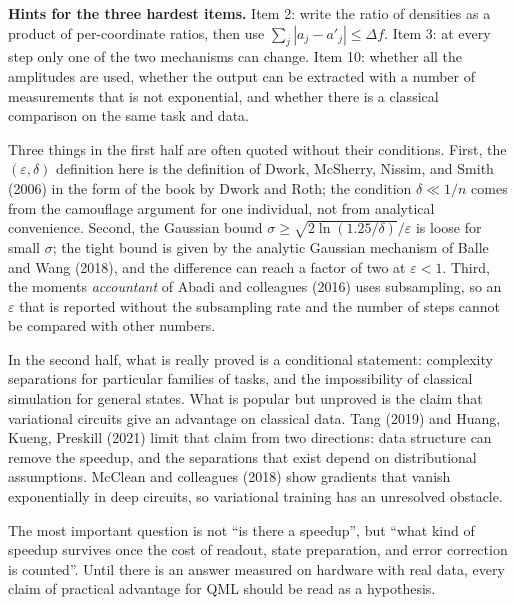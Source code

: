 \begin{latihan}
\noindent\textbf{Hints for the three hardest items.} Item 2: write the ratio of densities
as a product of per-coordinate ratios, then use $\sum_j|a_j-a'_j|\le\Delta f$. Item 3: at
every step only one of the two mechanisms can change. Item 10: whether all the amplitudes
are used, whether the output can be extracted with a number of measurements that is not
exponential, and whether there is a classical comparison on the same task and data.
\end{latihan}

\begin{untukpeneliti}
Three things in the first half are often quoted without their conditions. First, the
$(\varepsilon,\delta)$ definition here is the definition of Dwork, McSherry, Nissim, and
Smith (2006) in the form of the book by Dwork and Roth; the condition $\delta\ll 1/n$
comes from the camouflage argument for one individual, not from analytical convenience.
Second, the Gaussian bound $\sigma\ge\sqrt{2\ln(1.25/\delta)}/\varepsilon$ is loose for
small $\sigma$; the tight bound is given by the analytic Gaussian mechanism of Balle and
Wang (2018), and the difference can reach a factor of two at $\varepsilon<1$. Third, the
moments \emph{accountant} of Abadi and colleagues (2016) uses subsampling, so an
$\varepsilon$ that is reported without the subsampling rate and the number of steps cannot
be compared with other numbers.

In the second half, what is really proved is a conditional statement: complexity
separations for particular families of tasks, and the impossibility of classical
simulation for general states. What is popular but unproved is the claim that variational
circuits give an advantage on classical data. Tang (2019) and Huang, Kueng, Preskill
(2021) limit that claim from two directions: data structure can remove the speedup, and
the separations that exist depend on distributional assumptions. McClean and colleagues
(2018) show gradients that vanish exponentially in deep circuits, so variational training
has an unresolved obstacle.

The most important question is not ``is there a speedup'', but ``what kind of speedup
survives once the cost of readout, state preparation, and error correction is counted''.
Until there is an answer measured on hardware with real data, every claim of practical
advantage for QML should be read as a hypothesis.
\end{untukpeneliti}

